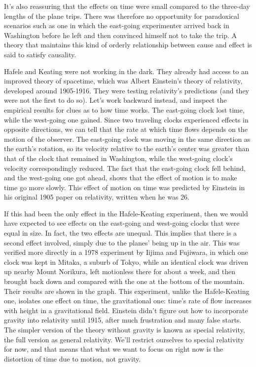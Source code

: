 It's also reassuring that the effects on time were
small compared to the three-day lengths of the plane trips. There was therefore no
opportunity for paradoxical scenarios such as one in which the east-going experimenter arrived
back in Washington before he left and then convinced himself not to take the trip.
A theory that maintains this kind of orderly relationship between cause and effect is said to satisfy causality.

Hafele and Keating were not working in the dark. They already had access to an improved
theory of spacetime, which was Albert Einstein's theory of relativity, developed around 1905-1916.
They were testing relativity's predictions (and they were not the first to do so).
Let's work backward instead, and
inspect the empirical results for clues as to how time works.
The east-going clock lost time, while the west-going one gained.
Since two traveling clocks experienced effects in opposite directions,
we can tell that the rate at which time flows depends on the motion
of the observer. The east-going clock was moving in the same direction as the earth's rotation, so its velocity
relative to the earth's center was greater than that of the clock that remained in Washington, while the west-going 
clock's velocity
correspondingly reduced. The fact that the east-going clock fell behind, and the west-going one got ahead,
shows that the effect of motion is to make time go more slowly. This effect of motion on time was predicted by
Einstein in his original 1905 paper on relativity, written when he was 26.




If this had been the only effect in the Hafele-Keating experiment, then we would have expected to see effects on the
east-going and west-going clocks that were equal in size.
In fact, the two effects are unequal. This
implies that there is a second effect involved, simply due to the planes' being up in the air.
This was verified more directly in a 1978 experiment by Iijima and Fujiwara, in which one clock was
kept in Mitaka, a suburb of Tokyo, while an identical clock was driven up nearby Mount Norikura,
left motionless there for about a week, and then brought back down and compared with the one at the bottom of the mountain.
Their results are shown in the graph.
This experiment, unlike the Hafele-Keating one, isolates one effect on time, the gravitational one: time's
rate of flow increases with height in a gravitational field. Einstein didn't figure out
how to incorporate gravity into relativity until 1915, after much frustration and many false starts. The
simpler version of the theory without gravity is known as special relativity, the full version as general
relativity. We'll restrict ourselves to special relativity for now, and that means that what we want to
focus on right now is the distortion of time due to motion, not gravity.


